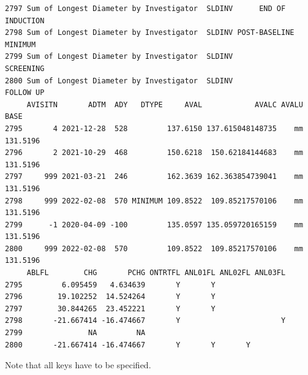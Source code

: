 \documentclass[
  letterpaper,
  DIV=11,
  numbers=noendperiod]{scrreprt}
\begin{document}
\begin{tcolorbox}[enhanced jigsaw, leftrule=.75mm, arc=.35mm, colback=white, colframe=quarto-callout-note-color-frame, opacityback=0, toprule=.15mm, bottomrule=.15mm, rightrule=.15mm, left=2mm, breakable]
\begin{minipage}[t]{\textwidth - 5.5mm}
\begin{verbatim}
2797 Sum of Longest Diameter by Investigator  SLDINV      END OF INDUCTION
2798 Sum of Longest Diameter by Investigator  SLDINV POST-BASELINE MINIMUM
2799 Sum of Longest Diameter by Investigator  SLDINV             SCREENING
2800 Sum of Longest Diameter by Investigator  SLDINV             FOLLOW UP
     AVISITN       ADTM  ADY   DTYPE     AVAL            AVALC AVALU     BASE
2795       4 2021-12-28  528         137.6150 137.615048148735    mm 131.5196
2796       2 2021-10-29  468         150.6218  150.62184144683    mm 131.5196
2797     999 2021-03-21  246         162.3639 162.363854739041    mm 131.5196
2798     999 2022-02-08  570 MINIMUM 109.8522  109.85217570106    mm 131.5196
2799      -1 2020-04-09 -100         135.0597 135.059720165159    mm 131.5196
2800     999 2022-02-08  570         109.8522  109.85217570106    mm 131.5196
     ABLFL        CHG       PCHG ONTRTFL ANL01FL ANL02FL ANL03FL
2795         6.095459   4.634639       Y       Y                
2796        19.102252  14.524264       Y       Y                
2797        30.844265  23.452221       Y       Y                
2798       -21.667414 -16.474667       Y                       Y
2799               NA         NA                                
2800       -21.667414 -16.474667       Y       Y       Y        
\end{verbatim}

Note that all keys have to be specified.\end{minipage}%
\end{tcolorbox}
\end{document}
